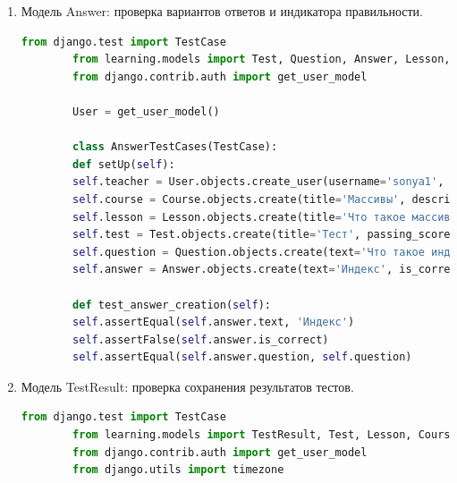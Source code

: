 \begin{enumerate}
\begin{lstlisting}[language=Python, caption=Модульный тест для Question, label=lst:question_test]
		class QuestionTestCases(TestCase):
		def setUp(self):
		self.teacher = User.objects.create_user(username='sonya1', password='vanya232323', is_teacher=True)
		self.course = Course.objects.create(title='Массивы', description='Описание курса', creator=self.teacher)
		self.lesson = Lesson.objects.create(title='Поиск индекса элемента в массиве', content='Содержимое урока', order=1, course=self.course)
		self.test = Test.objects.create(title='Тест', passing_score=80, lesson=self.lesson, is_active=True)
		self.question = Question.objects.create(
		text='Что такое массив?',
		question_type='single',
		points=10,
		test=self.test
		)
		
		def test_question_creation(self):
		self.assertEqual(self.question.text, 'Что такое массив?')
		self.assertEqual(self.question.question_type, 'single')
		self.assertEqual(self.question.test, self.test)
	\end{lstlisting}
	
	\item Модель Answer: проверка вариантов ответов и индикатора правильности.
	\begin{lstlisting}[language=Python, caption=Модульный тест для Answer, label=lst:answer_test]
		from django.test import TestCase
		from learning.models import Test, Question, Answer, Lesson, Course
		from django.contrib.auth import get_user_model
		
		User = get_user_model()
		
		class AnswerTestCases(TestCase):
		def setUp(self):
		self.teacher = User.objects.create_user(username='sonya1', password='vanya232323', is_teacher=True)
		self.course = Course.objects.create(title='Массивы', description='Описание курса', creator=self.teacher)
		self.lesson = Lesson.objects.create(title='Что такое массивы', content='Содержимое урока', order=1, course=self.course)
		self.test = Test.objects.create(title='Тест', passing_score=70, lesson=self.lesson)
		self.question = Question.objects.create(text='Что такое индекс?', question_type='single', points=10, test=self.test)
		self.answer = Answer.objects.create(text='Индекс', is_correct=False, question=self.question, order=1)
		
		def test_answer_creation(self):
		self.assertEqual(self.answer.text, 'Индекс')
		self.assertFalse(self.answer.is_correct)
		self.assertEqual(self.answer.question, self.question)
	\end{lstlisting}
	
	\item Модель TestResult: проверка сохранения результатов тестов.
	\begin{lstlisting}[language=Python, caption=Модульный тест для TestResult, label=lst:testresult_test]
		from django.test import TestCase
		from learning.models import TestResult, Test, Lesson, Course
		from django.contrib.auth import get_user_model
		from django.utils import timezone
		

\end{lstlisting}
\end{enumerate}
